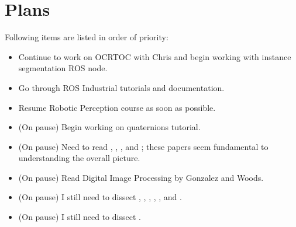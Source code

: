 \documentclass[11pt]{article}
\begin{document}
\newpage

\section{Plans}
Following items are listed in order of priority:

\begin{itemize}
	\item Continue to work on OCRTOC with Chris and begin working with instance segmentation ROS node.

	\item Go through ROS Industrial tutorials and documentation.

	\item Resume Robotic Perception course as soon as possible.

	\item (On pause) Begin working on quaternions tutorial.

	\item (On pause) Need to read \cite{ImSRwDeepCNN}, \cite{MixDNNforSISR}, \cite{mModalSemanticSLAMwProb}, and \cite{RCANforImClass}; these papers seem fundamental to understanding the overall picture.

	\item (On pause) Read Digital Image Processing by Gonzalez and Woods.

	\item (On pause) I still need to dissect \cite{PanopticSeg2019}, \cite{SVO}, \cite{HornsMethod}, \cite{NYUV2}, \cite{DGCNNLPC}, and \cite{MaskRCNN}.

	\item (On pause) I still need to dissect \cite{ZinsserWilliamKnowlton2006Oww}.
\end{itemize}



\newpage


\end{document}
